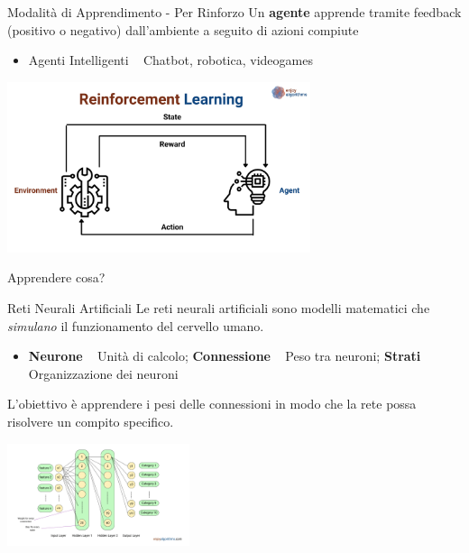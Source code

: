 \documentclass[presentation, 10pt,aspectratio=169]{beamer}\mode<presentation>{\usetheme{AMSBolognaFC}}
\begin{document}
\begin{frame}{Modalità di Apprendimento - Per Rinforzo}
	Un \textbf{agente} apprende tramite \alert{feedback} (positivo o negativo) dall'ambiente a seguito di azioni compiute
	\begin{itemize}
		\item Agenti Intelligenti \faArrowRight ~ Chatbot, robotica, videogames
	\end{itemize}
	\begin{center}
	\includegraphics[height=5cm]{img/reinforcement-learning.png}
	\end{center}
\end{frame}
\begin{frame}{Apprendere cosa?}
	\begin{exampleblock}{Reti Neurali Artificiali}
		Le reti neurali artificiali sono modelli matematici 
		che \emph{simulano} il funzionamento del cervello umano.
		\begin{itemize}
			\item \textbf{Neurone} \faArrowRight ~ Unità di calcolo; \textbf{Connessione} \faArrowRight ~ Peso tra neuroni; \textbf{Strati} \faArrowRight ~ Organizzazione dei neuroni
		\end{itemize}
		L'obiettivo è \alert{apprendere} i pesi delle connessioni in modo che la rete possa risolvere un compito specifico.
	\end{exampleblock}
	\begin{center}
	\includegraphics[width=0.4\textwidth]{img/ann.png}
	\end{center}
\end{frame}
\end{document}
